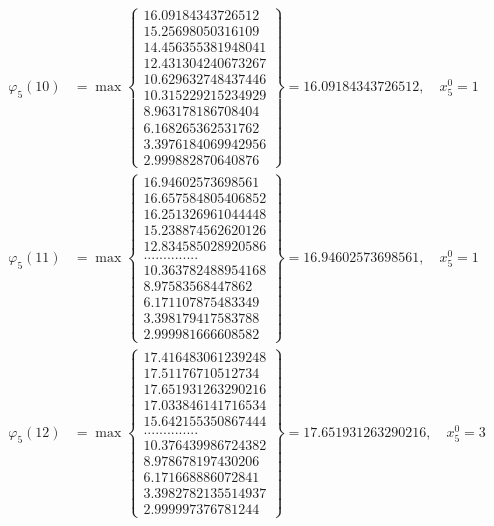 \documentclass{article}
\begin{document}
\begin{align*}
  
  
  
\varphi_{5}(10) &= \max \left\{ \begin{array}{c}
16.09184343726512 \\
 15.25698050316109 \\
 14.456355381948041 \\
 12.431304240673267 \\
 10.629632748437446 \\
 10.315229215234929 \\
 8.963178186708404 \\
 6.168265362531762 \\
 3.3976184069942956 \\
 2.999882870640876
\end{array} \right\} = 16.09184343726512, \quad x_{5}^0 = 1\\
  
  
  
  
\varphi_{5}(11) &= \max \left\{ \begin{array}{c}
16.94602573698561 \\
 16.657584805406852 \\
 16.251326961044448 \\
 15.238874562620126 \\
 12.834585028920586 \\
 .............. \\
 10.363782488954168 \\
 8.97583568447862 \\
 6.171107875483349 \\
 3.398179417583788 \\
 2.999981666608582
\end{array} \right\} = 16.94602573698561, \quad x_{5}^0 = 1\\
  
  
  
  
\varphi_{5}(12) &= \max \left\{ \begin{array}{c}
17.416483061239248 \\
 17.51176710512734 \\
 17.651931263290216 \\
 17.033846141716534 \\
 15.642155350867444 \\
 .............. \\
 10.376439986724382 \\
 8.978678197430206 \\
 6.171668886072841 \\
 3.3982782135514937 \\
 2.999997376781244
\end{array} \right\} = 17.651931263290216, \quad x_{5}^0 = 3\\
  

\end{align*}
\end{document}
